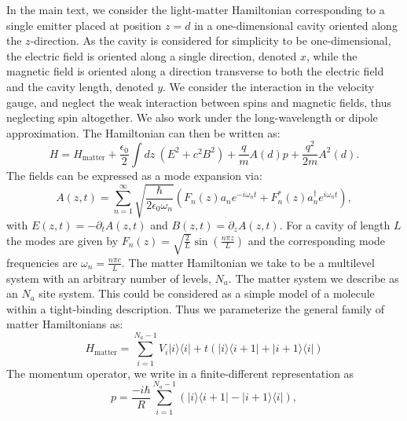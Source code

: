 \documentclass[aps,prb,twocolumn,
	groupedaddress,superscriptaddress,
	amsfonts,amssymb,amsmath,floatfix,
	citeautoscript]{revtex4-1}
\begin{document}
In the main text, we consider the light-matter Hamiltonian corresponding to a single emitter placed at position $z=d$ in a one-dimensional cavity oriented along the $z$-direction. As the cavity is considered for simplicity to be one-dimensional, the electric field is oriented along a single direction, denoted $x$, while the magnetic field is oriented along a direction transverse to both the electric field and the cavity length, denoted $y$. We consider the interaction in the velocity gauge, and neglect the weak interaction between spins and magnetic fields, thus neglecting spin altogether. We also work under the long-wavelength or dipole approximation. The Hamiltonian can then be written as:
\begin{equation}\label{eq:hamiltonian}
H = H_{\text{matter}}+\frac{\epsilon_0}{2}\int dz~(E^2+c^2B^2)+\frac{q}{m}A(d)p + \frac{q^2}{2m}A^2(d).
\end{equation}
The fields can be expressed as a mode expansion via:
\begin{equation}\label{eq:mode_expansion}
A(z,t) = \sum\limits_{n=1}^{\infty} \sqrt{\frac{\hbar}{2\epsilon_0\omega_n }}(F_n(z)a_ne^{-i\omega_n t}+F^*_n(z)a_n^{\dagger}e^{i\omega_n t}),
\end{equation}
with $E(z,t) = -\partial_t A(z,t)$ and $B(z,t)=\partial_z A(z,t)$. For a cavity of length $L$ the modes are given by $F_n(z) = \sqrt{\frac{2}{L}}\sin\left(\frac{n\pi z}{L} \right)$ and the corresponding mode frequencies are $\omega_n = \frac{n\pi c}{L}$. The matter Hamiltonian we take to be a multilevel system with an arbitrary number of levels, $N_a$. The matter system we describe as an $N_a$ site system. This could be considered as a simple model of a molecule within a tight-binding description. Thus we parameterize the general family of matter Hamiltonians as:
\begin{equation}\label{eq:matter_hamiltonian}
H_{\text{matter}} = \sum\limits_{i=1}^{{N_a-1}} V_i|i\rangle\langle i|+t(|i\rangle\langle i+1|+|i+1\rangle\langle i|) 
\end{equation}
The momentum operator, we write in a finite-different representation as
\begin{equation}\label{eq:momentum_operator}
p = \frac{-i\hbar}{R}\sum\limits_{i=1}^{N_a-1} \left(|i\rangle\langle i+1|-|i+1\rangle\langle i| \right),
\end{equation}
\end{document}
